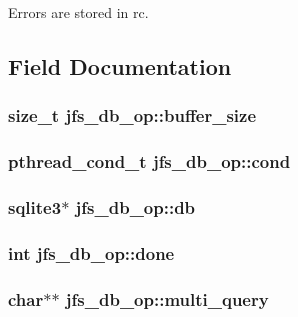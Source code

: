Errors are stored in rc. 

\subsection{Field Documentation}
\hypertarget{structjfs__db__op_a641b456e4e88432ddd4b59bdf75d43bd}{
\subsubsection[{buffer\_\-size}]{\setlength{\rightskip}{0pt plus 5cm}size\_\-t {\bf jfs\_\-db\_\-op::buffer\_\-size}}}
\label{structjfs__db__op_a641b456e4e88432ddd4b59bdf75d43bd}
\hypertarget{structjfs__db__op_adec1c36c799aec505c76ab0efc41ab5a}{
\subsubsection[{cond}]{\setlength{\rightskip}{0pt plus 5cm}pthread\_\-cond\_\-t {\bf jfs\_\-db\_\-op::cond}}}
\label{structjfs__db__op_adec1c36c799aec505c76ab0efc41ab5a}
\hypertarget{structjfs__db__op_a8547f4c79a291d7c581c64c2eb0e83ba}{
\subsubsection[{db}]{\setlength{\rightskip}{0pt plus 5cm}sqlite3$\ast$ {\bf jfs\_\-db\_\-op::db}}}
\label{structjfs__db__op_a8547f4c79a291d7c581c64c2eb0e83ba}
\hypertarget{structjfs__db__op_a6331deccf4026cf7ba1738c6e28c2f7a}{
\subsubsection[{done}]{\setlength{\rightskip}{0pt plus 5cm}int {\bf jfs\_\-db\_\-op::done}}}
\label{structjfs__db__op_a6331deccf4026cf7ba1738c6e28c2f7a}
\hypertarget{structjfs__db__op_a2b4f1fe422fb750b7ee7470d186f0110}{
\subsubsection[{multi\_\-query}]{\setlength{\rightskip}{0pt plus 5cm}char$\ast$$\ast$ {\bf jfs\_\-db\_\-op::multi\_\-query}}}
